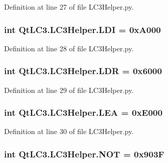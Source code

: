 Definition at line 27 of file L\-C3\-Helper.\-py.

\hypertarget{namespace_qt_l_c3_1_1_l_c3_helper_a102fef9d0708f7b9d1f6af3a541ed5fa}{
\subsubsection[{L\-D\-I}]{\setlength{\rightskip}{0pt plus 5cm}int Qt\-L\-C3.\-L\-C3\-Helper.\-L\-D\-I = 0x\-A000}}\label{namespace_qt_l_c3_1_1_l_c3_helper_a102fef9d0708f7b9d1f6af3a541ed5fa}


Definition at line 28 of file L\-C3\-Helper.\-py.

\hypertarget{namespace_qt_l_c3_1_1_l_c3_helper_a671ecbeb3d540e5d11929c18d3ff37f7}{
\subsubsection[{L\-D\-R}]{\setlength{\rightskip}{0pt plus 5cm}int Qt\-L\-C3.\-L\-C3\-Helper.\-L\-D\-R = 0x6000}}\label{namespace_qt_l_c3_1_1_l_c3_helper_a671ecbeb3d540e5d11929c18d3ff37f7}


Definition at line 29 of file L\-C3\-Helper.\-py.

\hypertarget{namespace_qt_l_c3_1_1_l_c3_helper_a6582e54ef243974ac33d19bdef271a30}{
\subsubsection[{L\-E\-A}]{\setlength{\rightskip}{0pt plus 5cm}int Qt\-L\-C3.\-L\-C3\-Helper.\-L\-E\-A = 0x\-E000}}\label{namespace_qt_l_c3_1_1_l_c3_helper_a6582e54ef243974ac33d19bdef271a30}


Definition at line 30 of file L\-C3\-Helper.\-py.

\hypertarget{namespace_qt_l_c3_1_1_l_c3_helper_a801523098ae57c18b172eac2319261fd}{
\subsubsection[{N\-O\-T}]{\setlength{\rightskip}{0pt plus 5cm}int Qt\-L\-C3.\-L\-C3\-Helper.\-N\-O\-T = 0x903\-F}}\label{namespace_qt_l_c3_1_1_l_c3_helper_a801523098ae57c18b172eac2319261fd}


